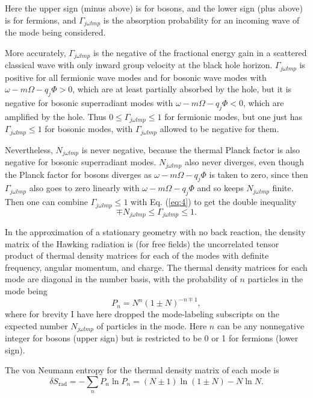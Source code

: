 \documentclass[12pt]{article} \usepackage{latexsym}
\begin{document}
Here the upper sign (minus above) is for bosons, and the lower sign
(plus above) is for fermions, and $\Gamma_{j\omega lmp}$ is the
absorption probability for an incoming wave of the mode being
considered.

More accurately, $\Gamma_{j\omega lmp}$ is the negative of the
fractional energy gain in a scattered classical wave with only inward
group velocity at the black hole horizon.  $\Gamma_{j\omega lmp}$ is
positive for all fermionic wave modes and for bosonic wave modes with
$\omega-m\Omega-q_j\Phi > 0$, which are at least partially absorbed by
the hole, but it is negative for bosonic superradiant modes with
$\omega-m\Omega-q_j\Phi < 0$, which are amplified by the hole.  Thus
$0 \le \Gamma_{j\omega lmp} \le 1$ for fermionic modes, but one just
has $\Gamma_{j\omega lmp} \le 1$ for bosonic modes, with
$\Gamma_{j\omega lmp}$ allowed to be negative for them.

Nevertheless, $N_{j\omega lmp}$ is never negative, because the thermal
Planck factor is also negative for bosonic superradiant modes.
$N_{j\omega lmp}$ also never diverges, even though the Planck factor
for bosons diverges as $\omega-m\Omega-q_j\Phi$ is taken to zero,
since then $\Gamma_{j\omega lmp}$ also goes to zero linearly with
$\omega-m\Omega-q_j\Phi$ and so keeps $N_{j\omega lmp}$ finite.
Then one can combine $\Gamma_{j\omega lmp} \le 1$ with Eq. (\ref{eq:4})
to get the double inequality
 \begin{equation}
 \mp N_{j\omega lmp} \le \Gamma_{j\omega lmp} \le 1.
 \label{eq:4b}
 \end{equation}

In the approximation of a stationary geometry with no back reaction,
the density matrix of the Hawking radiation is (for free fields) the
uncorrelated tensor product of thermal density matrices for each of
the modes with definite frequency, angular momentum, and charge.  The
thermal density matrices for each mode are diagonal in the number
basis, with the probability of $n$ particles in the mode being
 \begin{equation}
 P_n = N^n (1\pm N)^{-n\mp 1},
 \label{eq:5}
 \end{equation}
where for brevity I have here dropped the mode-labeling subscripts on
the expected number $N_{j\omega lmp}$ of particles in the mode.  Here
$n$ can be any nonnegative integer for bosons (upper sign) but is
restricted to be 0 or 1 for fermions (lower sign).

The von Neumann entropy for the thermal density matrix of each mode is
 \begin{equation}
 \delta S_{\mathrm{rad}} = - \sum_n P_n \ln P_n
              = (N \pm 1)\ln{(1 \pm N)} - N\ln{N}.
 \label{eq:5b}
 \end{equation}
\end{document}
